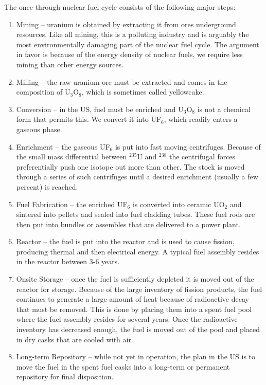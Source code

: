 The once-through nuclear fuel cycle consists of the following major steps:
\begin{enumerate}
  \item Mining -- uranium is obtained by extracting it from ores underground resources. Like all mining, this is a polluting industry and is arguably the most environmentally damaging part of the nuclear fuel cycle. The argument in favor is because of the energy density of nuclear fuels, we require less mining than other energy sources.
  \item Milling -- the raw uranium ore must be extracted and comes in the composition of U$_3$O$_8$, which is sometimes called yellowcake. 
  \item Conversion -- in the US, fuel must be enriched and U$_3$O$_8$ is not a chemical form that permits this. We convert it into UF$_6$, which readily enters a gaseous phase.
  \item Enrichment -- the gaseous UF$_6$ is put into fast moving centrifuges. Because of the small mass differential between $^{235}$U and $^{238}$ the centrifugal forces preferentially push one isotope out more than other. The stock is moved through a series of such centrifuges until a desired enrichment (usually a few percent) is reached.
  \item Fuel Fabrication -- the enriched UF$_6$ is converted into ceramic UO$_2$ and sintered into pellets and sealed into fuel cladding tubes. These fuel rods are then put into bundles or assembles that are delivered to a power plant.
  \item Reactor -- the fuel is put into the reactor and is used to cause fission, producing thermal and then electrical energy. A typical fuel assembly resides in the reactor between 3-6 years.
  \item Onsite Storage -- once the fuel is sufficiently depleted it is moved out of the reactor for storage. Because of the large inventory of fission products, the fuel continues to generate a large amount of heat because of radioactive decay that must be removed. This is done by placing them into a spent fuel pool where the fuel assembly resides for several years. Once the radioactive inventory has decreased enough, the fuel is moved out of the pool and placed in dry casks that are cooled with air.
  \item Long-term Repository -- while not yet in operation, the plan in the US is to move the fuel in the spent fuel casks into a long-term or permanent repository for final disposition.
\end{enumerate}
 
